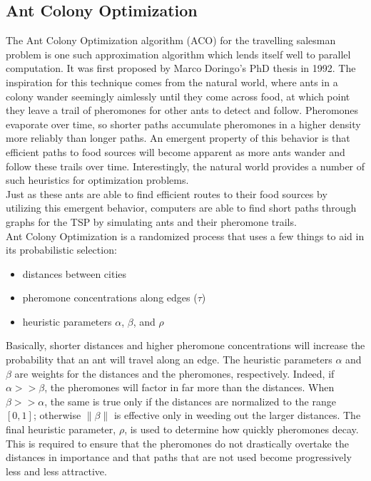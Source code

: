 \documentclass[twocolumn]{article}
\begin{document}
\subsection{Ant Colony Optimization} \label{sub:aco}

The Ant Colony Optimization algorithm (ACO) for the travelling salesman problem 
is one such approximation algorithm which lends itself well to parallel 
computation. It was first proposed by Marco Doringo's PhD thesis in 1992. The 
inspiration for this technique comes from the natural world, where ants in a
colony wander seemingly aimlessly until they come across food, at which point
they leave a trail of pheromones for other ants to detect and follow. Pheromones
evaporate over time, so shorter paths accumulate pheromones in a higher density 
more reliably than longer paths. An emergent property of this behavior is that 
efficient paths to food sources will become apparent as more ants wander and 
follow these trails over time. Interestingly, the natural world provides a number
of such heuristics for optimization problems.\\

Just as these ants are able to find efficient routes to their food sources by
utilizing this emergent behavior, computers are able to find short paths through
graphs for the TSP by simulating ants and their pheromone trails. \\

Ant Colony Optimization is a randomized process that uses a few things to aid
in its probabilistic selection:
\begin{itemize}
\item distances between cities
\item pheromone concentrations along edges ($\tau$)
\item heuristic parameters $\alpha$, $\beta$, and $\rho$
\end{itemize}
Basically, shorter distances and higher pheromone concentrations will increase the probability
that an ant will travel along an edge. The heuristic parameters $\alpha$ and $\beta$ are 
weights for the distances and the pheromones, respectively. Indeed, if $\alpha >> \beta$, the 
pheromones will factor in far more than the distances. When $\beta >> \alpha$, the same is true 
only if the distances are normalized to the range $[0,1]$; otherwise $\|\beta\|$ is effective 
only in weeding out the larger distances. The final heuristic parameter, $\rho$, is used to 
determine how quickly pheromones decay. This is required to ensure that the pheromones do not
drastically overtake the distances in importance and that paths that are not used become 
progressively less and less attractive. \\
\end{document}
